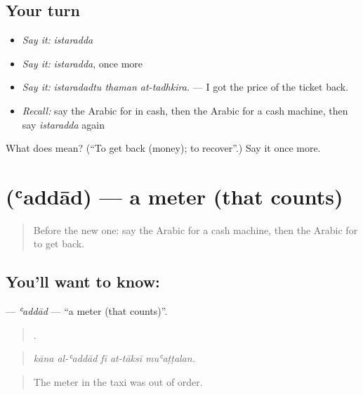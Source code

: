 \subsection*{Your turn}
\begin{itemize}
\raggedright
  \item \emph{Say it:} \emph{istaradda}
  \item \emph{Say it:} \emph{istaradda}, once more
  \item \emph{Say it:} \emph{istaradadtu thaman at-tadhkira.} — I got the price of the ticket back.
  \item \emph{Recall:} say the Arabic for in cash, then the Arabic for a cash machine, then say \emph{istaradda} again
\end{itemize}

\begin{tcolorbox}[breakable,colback=teal!4,colframe=teal!35!black,title={Before you move on}]
What does  mean? (\textquotedblleft{}To get back (money); to recover\textquotedblright{}.) Say it once more.
\end{tcolorbox}
\section[\texorpdfstring{\ar{عداد} (ʿaddād)}{عداد (ʿaddād)}]{ (ʿaddād) — a meter (that counts)}

\label{lesson:AR-C453-addad}



\begin{quote}
Before the new one: say the Arabic for a cash machine, then the Arabic for to get back.
\end{quote}

\subsection*{You'll want to know: }
\textbf{} — \emph{ʿaddād} — \textquotedblleft{}a meter (that counts)\textquotedblright{}.

\begin{quote}
    .
\end{quote}

\begin{quote}
\emph{kāna al-ʿaddād fī at-tāksī muʿaṭṭalan.}
\end{quote}

\begin{quote}
The meter in the taxi was out of order.
\end{quote}

